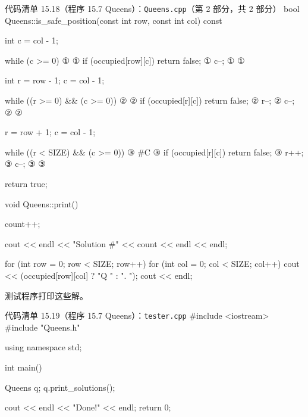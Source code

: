 \begin{codeboxt}{代码清单 15.18（程序 15.7 Queens）：\texttt{Queens.\allowbreak{}cpp}（第 2 部分，共 2 部分）}
bool Queens::is_safe_position(const int row, const int col) const
{
    int c = col - 1;

    while (c >= 0)                           ①
    {                                        ①
        if (occupied[row][c]) return false;  ①
        c--;                                 ①
    }                                        ①

    int r = row - 1;
    c = col - 1;

    while ((r >= 0) && (c >= 0))             ②
    {                                        ②
        if (occupied[r][c]) return false;    ②
        r--;                                 ②
        c--;                                 ②
    }                                        ②

    r = row + 1;
    c = col - 1;

    while ((r < SIZE) && (c >= 0))           ③
    {    #C                                  ③
        if (occupied[r][c]) return false;    ③
        r++;                                 ③
        c--;                                 ③
    }                                        ③

    return true;
}

void Queens::print()
{
    count++;

    cout << endl << "Solution #" << count << endl << endl;

    for (int row = 0; row < SIZE; row++)
    {
        for (int col = 0; col < SIZE; col++)
        {
            cout << (occupied[row][col] ? "Q " : ". ");
        }
        cout << endl;
    }
}
\end{codeboxt}
\par
{}\par
{}\par

测试程序打印这些解。

\begin{codeboxt}{代码清单 15.19（程序 15.7 Queens）：\texttt{tester.\allowbreak{}cpp}}
#include <iostream>
#include "Queens.h"

using namespace std;

int main()
{
    Queens q;
    q.print_solutions();

    cout << endl << "Done!" << endl;
    return 0;
}
\end{codeboxt}

